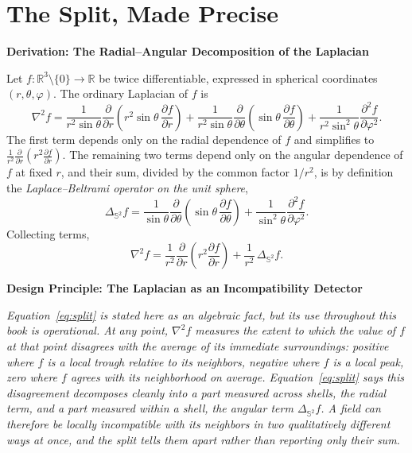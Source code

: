 \documentclass[11pt,fleqn]{book}
\numberwithin{equation}{chapter}
\newenvironment{principle}[1]
  {\begin{principleEnv}
   \noindent\textbf{Design Principle: #1}\par\smallskip\itshape}
  {\end{principleEnv}}
\newenvironment{derivation}[1]
  {\begin{derivationEnv}
   \noindent\textbf{Derivation: #1}\par\smallskip}
  {\end{derivationEnv}}
\theoremstyle{plain}
\theoremstyle{definition}
\theoremstyle{remark}
\newcommand{\Sphere}{\mathbb{S}^{2}}
\newcommand{\R}{\mathbb{R}}
\begin{document}
\section{The Split, Made Precise}

\begin{derivation}{The Radial--Angular Decomposition of the Laplacian}
Let \(f:\R^3\setminus\{0\}\to\R\) be twice differentiable, expressed in spherical coordinates \((r,\theta,\varphi)\). The ordinary Laplacian of \(f\) is
\[
\nabla^2 f = \frac{1}{r^2\sin\theta}\frac{\partial}{\partial r}\!\left(r^2\sin\theta\,\frac{\partial f}{\partial r}\right)
+ \frac{1}{r^2\sin\theta}\frac{\partial}{\partial\theta}\!\left(\sin\theta\,\frac{\partial f}{\partial\theta}\right)
+ \frac{1}{r^2\sin^2\theta}\frac{\partial^2 f}{\partial\varphi^2}.
\]
The first term depends only on the radial dependence of \(f\) and simplifies to \(\frac{1}{r^2}\frac{\partial}{\partial r}\!\left(r^2\frac{\partial f}{\partial r}\right)\). The remaining two terms depend only on the angular dependence of \(f\) at fixed \(r\), and their sum, divided by the common factor \(1/r^2\), is by definition the \emph{Laplace--Beltrami operator on the unit sphere},
\[
\Delta_{\Sphere} f = \frac{1}{\sin\theta}\frac{\partial}{\partial\theta}\!\left(\sin\theta\,\frac{\partial f}{\partial\theta}\right) + \frac{1}{\sin^2\theta}\frac{\partial^2 f}{\partial\varphi^2}.
\]
Collecting terms,
\begin{equation}
\nabla^2 f = \frac{1}{r^2}\frac{\partial}{\partial r}\!\left(r^2\frac{\partial f}{\partial r}\right) + \frac{1}{r^2}\,\Delta_{\Sphere} f.
\label{eq:split}
\end{equation}
\end{derivation}

\begin{principle}{The Laplacian as an Incompatibility Detector}
Equation~\eqref{eq:split} is stated here as an algebraic fact, but its use throughout this book is operational. At any point, \(\nabla^2 f\) measures the extent to which the value of \(f\) at that point disagrees with the average of its immediate surroundings: positive where \(f\) is a local trough relative to its neighbors, negative where \(f\) is a local peak, zero where \(f\) agrees with its neighborhood on average. Equation~\eqref{eq:split} says this disagreement decomposes cleanly into a part measured across shells, the radial term, and a part measured within a shell, the angular term \(\Delta_{\Sphere}f\). A field can therefore be locally incompatible with its neighbors in two qualitatively different ways at once, and the split tells them apart rather than reporting only their sum.
\end{principle}
\end{document}
